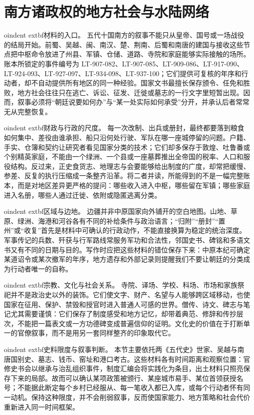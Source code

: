 \section{南方诸政权的地方社会与水陆网络}
\label{sec:southern-polities-local-society}

oindent	extbf{材料的入口。} 五代十国南方的叙事不能只从皇帝、国号或一场战役的结局开始。前蜀、吴越、闽、南汉、楚、荆南、后蜀和南唐的建国与接收这些节点把中枢命令放进了州县、军镇、仓储、道路、寺院和家庭能够实际接触的场所。账本所锁定的事件编号为 LT-907-082、LT-907-085、LT-909-086、LT-917-090、LT-924-093、LT-927-097、LT-934-098、LT-937-100；它们提供可复核的年序和行动者，却不自动提供所有地区的同一种经验。国家文书最擅长保存颁令、任免和胜败，地方社会往往只在逃亡、诉讼、征发、迁徙或墓志的一行文字里短暂出现。因而，叙事必须将“朝廷说要如何办”与“某一处实际如何承受”分开，并承认后者常常无从完整恢复。


oindent	extbf{财政与行政的尺度。} 每一次改制、出兵或册封，最终都要落到粮食如何集中、差役由谁承担、船只沿何处行驶、军队在哪一座城停留的问题。户籍、手实、仓簿和契约让研究者看见国家分类的技术；它们却多保存于敦煌、吐鲁番或个别精英家庭，不能由一个绿洲、一个县或一座墓葬推出全帝国的税率、人口和服役结构。反过来，正史食货志、地理志与会要能够给出制度的广度，却常把缓慢、参差、反复的执行压缩成一条整齐沿革。将二者并读，所能得到的不是一幅完整账本，而是对地区差异更严格的提问：哪些收入进入中枢，哪些留在军镇；哪些家庭进入名册，哪些人通过迁徙、依附或隐匿逃离分类。


oindent	extbf{区域与边地。} 边疆并非中原国家向外铺开的空白地图。山地、草原、绿洲、海港和河谷各有不同的补给条件与政治语言；“归附”“册封”“置州”或“收复”首先是材料中可确认的行政动作，不能直接换算为稳定的统治深度。军事传记的兵数、歼获与行军路线常服务军功和合法性，邻国史书、碑铭和多语文书又有不同的日期与目的。写作时应把这些材料的错位保存下来：中原本纪可确定某道诏令或某次撤军的年序，地方遗存和外部记录则提醒我们不要让朝廷的分类成为行动者唯一的自称。


oindent	extbf{宗教、文化与社会关系。} 寺院、译场、学校、科场、市场和家族祭祀并不是政治史以外的装饰。它们使文字、财产、名望与人能够跨区域移动，也使国家在征用、保护、禁毁和授官时进入普通人可感的世界。僧传、诗文、碑志与笔记尤其需要谨慎：它们保存了制度感受和地方记忆，却带着典范、修辞和传抄层次，不能把一篇表文或一方功德碑变成普遍信仰的证明。文化史的价值在于打断单一的官僚叙事，而不是用另一套同样整齐的印象取代它。


oindent	extbf{史料限度与叙事判断。} 本节主要依托两《五代史》世家、吴越与南唐国别史、墓志、钱币、窑址和港口考古。这些材料各有时间距离和观察位置：官修史书会以继承与治乱组织事件，制度汇编会将实践化为条目，出土材料只照亮保存下来的局部。故而可以确认某项政策被颁行、某座城市易手、某位首领获授名号；不能据此断定每个乡村已经服从、每一笔收入都已入库，或每个行动者怀有同一动机。保持这种限度，并不会削弱叙事，反而使国家能力、地方策略和社会代价重新进入同一时间框架。

